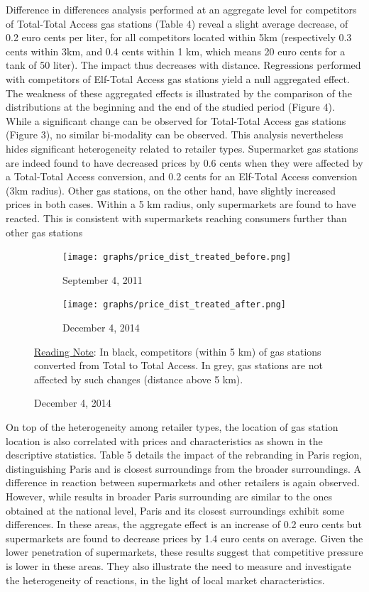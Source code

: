 \documentclass[english]{article}
\begin{document}
Difference in differences analysis performed at an aggregate level for competitors of Total-Total Access gas stations (Table 4) reveal a slight average decrease, of 0.2 euro cents per liter, for all competitors located within 5km (respectively 0.3 cents within 3km, and 0.4 cents within 1 km, which means 20 euro cents for a tank of 50 liter). The impact thus decreases with distance. Regressions performed with competitors of Elf-Total Access gas stations yield a null aggregated effect. The weakness of these aggregated effects is illustrated by the comparison of the distributions at the beginning and the end of the studied period (Figure 4). While a significant change can be observed for Total-Total Access gas stations (Figure 3), no similar bi-modality can be observed. This analysis nevertheless hides significant heterogeneity related to retailer types. Supermarket gas stations are indeed found to have decreased prices by 0.6 cents when they were affected by a Total-Total Access conversion, and 0.2 cents for an Elf-Total Access conversion (3km radius). Other gas stations, on the other hand, have slightly increased prices in both cases. Within a 5 km radius, only supermarkets are found to have reacted. This is consistent with supermarkets reaching consumers further than other gas stations \medskip{}

\begin{figure}[H]
\centering
\caption{Distributions of Total Access competitor prices vs .others}
\label{fig:price_dist_total_comp_ba}
\begin{subfigure}[t]{.49\columnwidth}
\centering
\texttt{[image: graphs/price\_dist\_treated\_before.png]}
\caption[short]{September 4, 2011}
\end{subfigure}
\begin{subfigure}[t]{.49\columnwidth}
\centering
\texttt{[image: graphs/price\_dist\_treated\_after.png]}
\caption[short]{December 4, 2014}
\end{subfigure}
\flushleft
{\small{}\uline{Reading Note}}{\small{}: In black, competitors (within 5 km) of gas stations converted from Total to Total Access. In grey, gas stations are not affected by such changes (distance above 5 km).}{\small \par}
\end{figure}

On top of the heterogeneity among retailer types, the location of gas station location is also correlated with prices and characteristics as shown in the descriptive statistics. Table 5 details the impact of the rebranding in Paris region, distinguishing Paris and is closest surroundings from the broader surroundings. A difference in reaction between supermarkets and other retailers is again observed. However, while results in broader Paris surrounding are similar to the ones obtained at the national level, Paris and its closest surroundings exhibit some differences. In these areas, the aggregate effect is an increase of 0.2 euro cents but supermarkets are found to decrease prices by 1.4 euro cents on average. Given the lower penetration of supermarkets, these results suggest that competitive pressure is lower in these areas. They also illustrate the need to measure and investigate the heterogeneity of reactions, in the light of local market characteristics.
\end{document}
